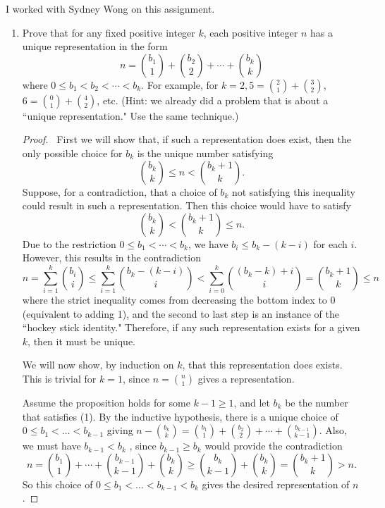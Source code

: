 \documentclass[12pt]{article}
\begin{document}
\noindent I worked with Sydney Wong on this assignment.

\begin{enumerate}[leftmargin=0cm,itemindent=.5cm,labelwidth=\itemindent,labelsep=0cm,align=left]

\item Prove that for any fixed positive integer $k$, each positive integer $n$ has a unique representation in the form
$$
n = \binom{b_1}{1} + \binom{b_2}{2} + \cdots + \binom{b_k}{k}
$$
where $0 \leq b_1 < b_2 < \cdots < b_k$.  For example, for $k = 2, 5 = \binom{2}{1} + \binom{3}{2}$, $6 = \binom{0}{1} + \binom{4}{2}$, etc. (Hint: we already did a problem that is about a ``unique representation."  Use the same technique.)

\begin{proof}
\ First we will show that, if such a representation does exist, then the only possible choice for $b_k$ is the unique number satisfying
$$
\binom{b_k}{k} \leq n < \binom{b_k + 1}{k}.
$$
Suppose, for a contradiction, that a choice of $b_k$ not satisfying this inequality could result in such a representation.  Then this choice would have to satisfy
$$
\binom{b_k}{k} < \binom{b_k + 1}{k} \leq n.
$$
Due to the restriction $0 \leq b_1 < \cdots < b_k$, we have $b_i \leq b_k - (k-i)$ for each $i$.  However, this results in the contradiction
$$
n = \sum\limits_{i=1}^k \binom{b_i}{i} \leq \sum\limits_{i=1}^k \binom{b_k - (k-i)}{i} < \sum\limits_{i=0}^k \binom{(b_k - k) + i}{i} = \binom{b_k + 1}{k} \leq n
$$
where the strict inequality comes from decreasing the bottom index to $0$ (equivalent to adding 1), and the second to last step is an instance of the ``hockey stick identity."  Therefore, if any such representation exists for a given $k$, then it must be unique.

We will now show, by induction on $k$, that this representation does exists.  This is trivial for $k = 1$, since $n = \binom{n}{1}$ gives a representation.

Assume the proposition holds for some $k-1 \geq 1$, and let $b_k$ be the number that satisfies (1).  By the inductive hypothesis, there is a unique choice of $0 \leq b_1 < \dots < b_{k-1}$ giving $n - \binom{b_k}{k} = \binom{b_1}{1} + \binom{b_2}{2} + \cdots + \binom{b_{k-1}}{k-1}$.  Also, we must have $b_{k-1} < b_k$ , since $b_{k-1} \geq b_k$ would provide the contradiction
$$
n = \binom{b_1}{1} + \cdots + \binom{b_{k-1}}{k-1} + \binom{b_k}{k} \geq \binom{b_k}{k-1} + \binom{b_k}{k} = \binom{b_k + 1}{k} > n.
$$
So this choice of $0 \leq b_1 < \dots < b_{k-1} < b_k$ gives the desired representation of $n$.
\end{proof}


\end{enumerate}
\end{document}
